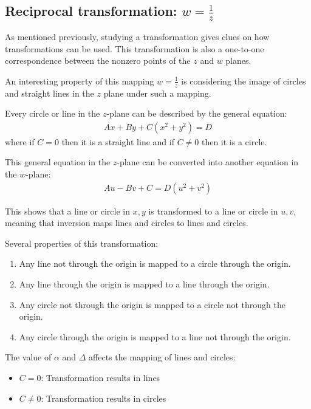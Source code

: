 \documentclass[10pt,a4paper]{article}
\begin{document}
\pagebreak

\subsection{Reciprocal transformation: $w=\frac{1}{z}$}

As mentioned previously, studying a transformation gives clues on how transformations can be used.
This transformation is also a one-to-one correspondence between the nonzero points of the $z$ and $w$
planes.

An interesting property of this mapping $w=\frac{1}{z}$ is considering the image of circles and
straight lines in the $z$ plane under such a mapping.

Every circle or line in the $z$-plane can be described by the general equation:
\begin{align*}
    Ax+By+C(x^2+y^2) =D
\end{align*}
where if $C = 0$ then it is a straight line and if $C \neq 0$ then it is a circle.

This general equation in the $z$-plane can be converted into another equation in the $w$-plane:
\begin{align*}
    Au - Bv + C = D(u^2 + v^2)
\end{align*}

This shows that a line or circle in $x,y$ is transformed to a line or circle in $u,v$, meaning that inversion maps lines and circles to lines and circles.

Several properties of this transformation:
\begin{enumerate}
    \item Any line not through the origin is mapped to a circle through the origin.
    \item Any line through the origin is mapped to a line through the origin.
    \item Any circle not through the origin is mapped to a circle not through the origin.
    \item Any circle through the origin is mapped to a line not through the origin.
\end{enumerate}

The value of $\alpha$ and $\Delta$ affects the mapping of lines and circles:
\begin{itemize}
    \item $C = 0$: Transformation results in lines
    \item $C \neq 0$: Transformation results in circles
\end{itemize}
\end{document}
